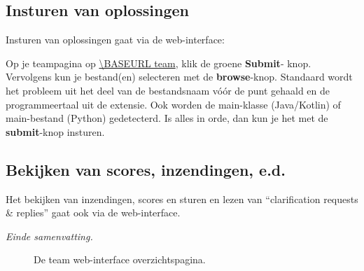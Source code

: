 \subsection*{Insturen van oplossingen}

Insturen van oplossingen gaat via%
de web-interface:
\begin{description}[\breaklabel\setlabelstyle{\bfseries}]
\item[Web-Interface]
Op je teampagina op \url{\BASEURL team}, klik de groene \textbf{Submit}-
knop. Vervolgens kun je bestand(en) selecteren met de \textbf{browse}-knop.
Standaard wordt het probleem uit het deel van de bestandsnaam v\'o\'or
de punt gehaald en de programmeertaal uit de extensie. Ook worden
de main-klasse (Java/Kotlin) of main-bestand (Python)
gedetecterd. Is alles in orde, dan kun je het met de \textbf{submit}-knop
insturen.

\end{description}

\subsection*{Bekijken van scores, inzendingen, e.d.}

Het bekijken van inzendingen, scores en sturen en lezen van
``clarification requests \& replies'' gaat ook via de web-interface.

\emph{Einde samenvatting.}

\begin{figure}[p]
  \centering
  \caption{De team web-interface overzichtspagina.}
  \label{fig:team-overview}
\end{figure}

